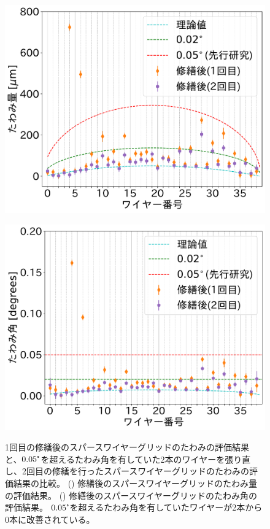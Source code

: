 \documentclass[../../main.tex]{subfiles}
\begin{document}
\begin{figure}[H]
    \begin{minipage}[b]{0.5\hsize}
        \centering
        \includegraphics[width=1.0\textwidth]{wiresag_swg/swg_sag_comparison2.pdf}
        \subcaption{}
        \label{fig:wiresag_swg_sag_result_repair2}
    \end{minipage}
    \begin{minipage}[b]{0.5\hsize}
        \centering
        \includegraphics[width=1.0\textwidth]{wiresag_swg/swg_sag_angle_comparison2.pdf}
        \subcaption{}
        \label{fig:wiresag_swg_sag_angle_result_repair2}
    \end{minipage}
    \caption{1回目の修繕後のスパースワイヤーグリッドのたわみの評価結果と、$0.05\tcdegree$を超えるたわみ角を有していた2本のワイヤーを張り直し、2回目の修繕を行ったスパースワイヤーグリッドのたわみの評価結果の比較。
             () 修繕後のスパースワイヤーグリッドのたわみ量の評価結果。
             () 修繕後のスパースワイヤーグリッドのたわみ角の評価結果。
             $0.05\tcdegree$を超えるたわみ角を有していたワイヤーが2本から0本に改善されている。}
    \label{fig:wiresag_swg_result_repair2}
\end{figure}
\end{document}
